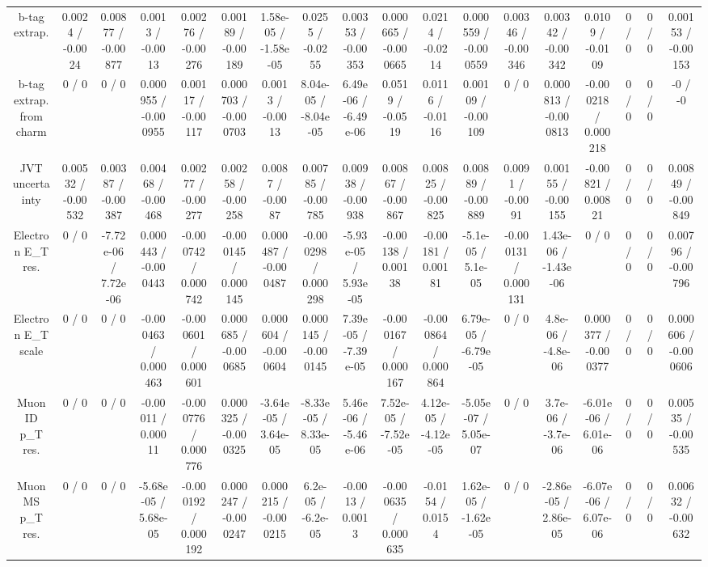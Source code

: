 \documentclass[10pt]{article}
\begin{document}
\begin{table}[htbp]
\begin{center}
\begin{tabular}{|c|c|c|c|c|c|c|c|c|c|c|c|c|c|c|c|c|c|}
  b-tag extrap. & 0.0024 / -0.0024 & 0.00877 / -0.00877 & 0.0013 / -0.0013 & 0.00276 / -0.00276 & 0.00189 / -0.00189 & 1.58e-05 / -1.58e-05 & 0.0255 / -0.0255 & 0.00353 / -0.00353 & 0.000665 / -0.000665 & 0.0214 / -0.0214 & 0.000559 / -0.000559 & 0.00346 / -0.00346 & 0.00342 / -0.00342 & 0.0109 / -0.0109 & 0 / 0 & 0 / 0 & 0.00153 / -0.00153 \\ 
  b-tag extrap. from charm & 0 / 0 & 0 / 0 & 0.000955 / -0.000955 & 0.00117 / -0.00117 & 0.000703 / -0.000703 & 0.0013 / -0.0013 & 8.04e-05 / -8.04e-05 & 6.49e-06 / -6.49e-06 & 0.0519 / -0.0519 & 0.0116 / -0.0116 & 0.00109 / -0.00109 & 0 / 0 & 0.000813 / -0.000813 & -0.000218 / 0.000218 & 0 / 0 & 0 / 0 & -0 / -0 \\ 
  JVT uncertainty & 0.00532 / -0.00532 & 0.00387 / -0.00387 & 0.00468 / -0.00468 & 0.00277 / -0.00277 & 0.00258 / -0.00258 & 0.0087 / -0.0087 & 0.00785 / -0.00785 & 0.00938 / -0.00938 & 0.00867 / -0.00867 & 0.00825 / -0.00825 & 0.00889 / -0.00889 & 0.0091 / -0.0091 & 0.00155 / -0.00155 & -0.00821 / 0.00821 & 0 / 0 & 0 / 0 & 0.00849 / -0.00849 \\ 
  Electron E_{T} res. & 0 / 0 & -7.72e-06 / 7.72e-06 & 0.000443 / -0.000443 & -0.000742 / 0.000742 & -0.000145 / 0.000145 & 0.000487 / -0.000487 & -0.000298 / 0.000298 & -5.93e-05 / 5.93e-05 & -0.00138 / 0.00138 & -0.00181 / 0.00181 & -5.1e-05 / 5.1e-05 & -0.000131 / 0.000131 & 1.43e-06 / -1.43e-06 & 0 / 0 & 0 / 0 & 0 / 0 & 0.00796 / -0.00796 \\ 
  Electron E_{T} scale & 0 / 0 & 0 / 0 & -0.000463 / 0.000463 & -0.000601 / 0.000601 & 0.000685 / -0.000685 & 0.000604 / -0.000604 & 0.000145 / -0.000145 & 7.39e-05 / -7.39e-05 & -0.000167 / 0.000167 & -0.000864 / 0.000864 & 6.79e-05 / -6.79e-05 & 0 / 0 & 4.8e-06 / -4.8e-06 & 0.000377 / -0.000377 & 0 / 0 & 0 / 0 & 0.000606 / -0.000606 \\ 
  Muon ID p_{T} res. & 0 / 0 & 0 / 0 & -0.00011 / 0.00011 & -0.000776 / 0.000776 & 0.000325 / -0.000325 & -3.64e-05 / 3.64e-05 & -8.33e-05 / 8.33e-05 & 5.46e-06 / -5.46e-06 & 7.52e-05 / -7.52e-05 & 4.12e-05 / -4.12e-05 & -5.05e-07 / 5.05e-07 & 0 / 0 & 3.7e-06 / -3.7e-06 & -6.01e-06 / 6.01e-06 & 0 / 0 & 0 / 0 & 0.00535 / -0.00535 \\ 
  Muon MS p_{T} res. & 0 / 0 & 0 / 0 & -5.68e-05 / 5.68e-05 & -0.000192 / 0.000192 & 0.000247 / -0.000247 & 0.000215 / -0.000215 & 6.2e-05 / -6.2e-05 & -0.0013 / 0.0013 & -0.000635 / 0.000635 & -0.0154 / 0.0154 & 1.62e-05 / -1.62e-05 & 0 / 0 & -2.86e-05 / 2.86e-05 & -6.07e-06 / 6.07e-06 & 0 / 0 & 0 / 0 & 0.00632 / -0.00632 \\ 

\end{tabular}
\end{center}
\end{table}
\end{document}
